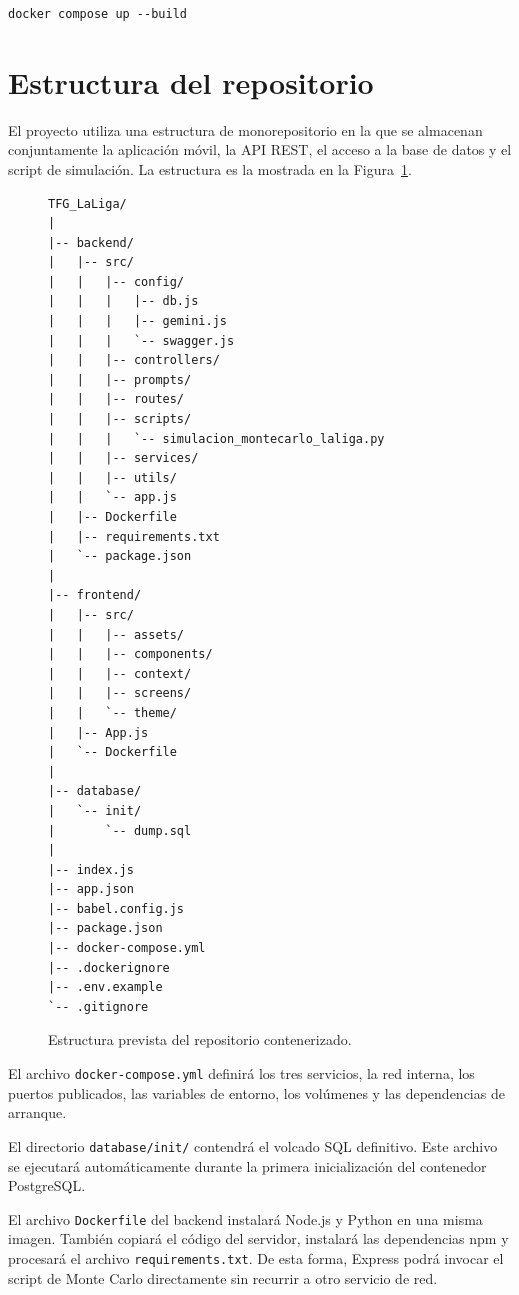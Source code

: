 \begin{lstlisting}
docker compose up --build
\end{lstlisting}

\section{Estructura del repositorio}

El proyecto utiliza una estructura de monorepositorio en la que se almacenan
conjuntamente la aplicaci\'on m\'ovil, la API REST, el acceso a la base de datos y
el script de simulaci\'on. La estructura es la mostrada en la Figura~\ref{fig:estructura-repositorio}.

\begin{figure}[H]
  \centering
  \begin{minipage}{0.92\textwidth}
\begin{lstlisting}
TFG_LaLiga/
|
|-- backend/
|   |-- src/
|   |   |-- config/
|   |   |   |-- db.js
|   |   |   |-- gemini.js
|   |   |   `-- swagger.js
|   |   |-- controllers/
|   |   |-- prompts/
|   |   |-- routes/
|   |   |-- scripts/
|   |   |   `-- simulacion_montecarlo_laliga.py
|   |   |-- services/
|   |   |-- utils/
|   |   `-- app.js
|   |-- Dockerfile
|   |-- requirements.txt
|   `-- package.json
|
|-- frontend/
|   |-- src/
|   |   |-- assets/
|   |   |-- components/
|   |   |-- context/
|   |   |-- screens/
|   |   `-- theme/
|   |-- App.js
|   `-- Dockerfile
|
|-- database/
|   `-- init/
|       `-- dump.sql
|
|-- index.js
|-- app.json
|-- babel.config.js
|-- package.json
|-- docker-compose.yml
|-- .dockerignore
|-- .env.example
`-- .gitignore
\end{lstlisting}
  \end{minipage}
  \caption{Estructura prevista del repositorio contenerizado.}
  \label{fig:estructura-repositorio}
\end{figure}

El archivo \texttt{docker-compose.yml} definir\'a los tres servicios, la red
interna, los puertos publicados, las variables de entorno, los vol\'umenes y las
dependencias de arranque.

El directorio \texttt{database/init/} contendr\'a el volcado SQL definitivo. Este
archivo se ejecutar\'a autom\'aticamente durante la primera inicializaci\'on del
contenedor PostgreSQL.

El archivo \texttt{Dockerfile} del backend instalar\'a Node.js y Python en una
misma imagen. Tambi\'en copiar\'a el c\'odigo del servidor, instalar\'a las
dependencias npm y procesar\'a el archivo \texttt{requirements.txt}. De esta
forma, Express podr\'a invocar el script de Monte Carlo directamente sin recurrir
a otro servicio de red.

